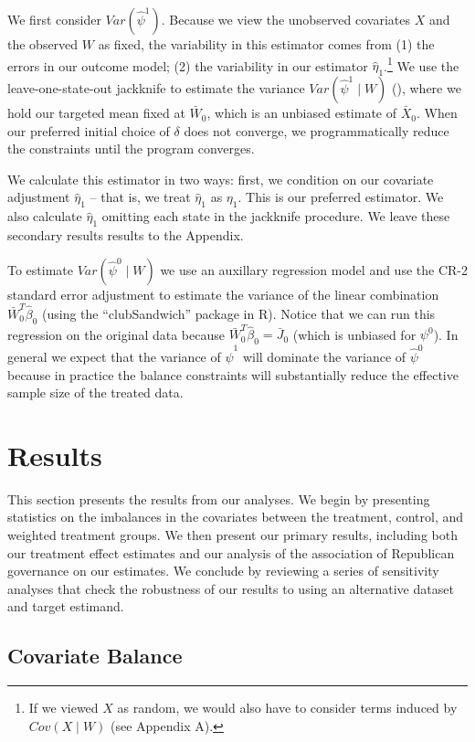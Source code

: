\documentclass[aoas]{imsart}
\theoremstyle{plain}
\theoremstyle{remark}
\begin{document}
We first consider $Var(\hat{\psi}^1)$. Because we view the unobserved covariates $X$ and the observed $W$ as fixed, the variability in this estimator comes from (1) the errors in our outcome model; (2) the variability in our estimator $\hat{\eta}_1$.\footnote{If we viewed $X$ as random, we would also have to consider terms induced by $Cov(X \mid W)$ (see Appendix A).} We use the leave-one-state-out jackknife to estimate the variance $Var(\hat{\psi}^1 \mid W)$ (\cite{cameron2015practitioner}), where we hold our targeted mean fixed at $\bar{W}_0$, which is an unbiased estimate of $\bar{X}_0$. When our preferred initial choice of $\delta$ does not converge, we programmatically reduce the constraints until the program converges. 

We calculate this estimator in two ways: first, we condition on our covariate adjustment $\hat{\eta}_1$ -- that is, we treat $\hat{\eta}_1$ as $\eta_1$. This is our preferred estimator. We also calculate $\hat{\eta}_1$ omitting each state in the jackknife procedure. We leave these secondary results results to the Appendix.

To estimate $Var(\hat{\psi}^0 \mid W)$ we use an auxillary regression model and use the CR-2 standard error adjustment to estimate the variance of the linear combination $\bar{W}_0^T\hat{\beta}_0$ (using the ``clubSandwich'' package in R). Notice that we can run this regression on the original data because $\bar{W}_0^T\hat{\beta}_0 = \bar{J}_0$ (which is unbiased for $\psi^0$). In general we expect that the variance of $\hat{\psi}^1$ will dominate the variance of $\hat{\psi}^0$ because in practice the balance constraints will substantially reduce the effective sample size of the treated data. 

\section{Results}

This section presents the results from our analyses. We begin by presenting statistics on the imbalances in the covariates between the treatment, control, and weighted treatment groups. We then present our primary results, including both our treatment effect estimates and our analysis of the association of Republican governance on our estimates. We conclude by reviewing a series of sensitivity analyses that check the robustness of our results to using an alternative dataset and target estimand.

\subsection{Covariate Balance}
\end{document}
